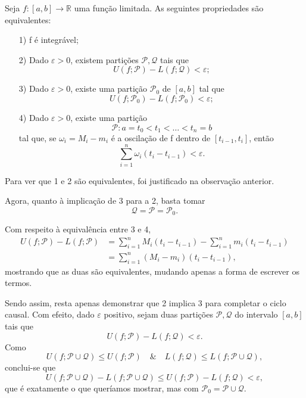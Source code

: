 \documentclass[../analysisII_notes.tex]{subfiles}
\begin{document}
\hypertarget{integrability_conditions}{
	\begin{theorem*}
		Seja \(f:[a, b]\rightarrow \mathbb{R}\) uma função limitada. As seguintes propriedades são equivalentes:
		\begin{itemize}
			\item[1)] f é integrável;
			\item[2)] Dado \(\varepsilon > 0\), existem partições \(\mathcal{P}, \mathcal{Q}\) tais que
			      \[
				      U(f; \mathcal{P}) - L(f; \mathcal{Q})<\varepsilon ;
			      \]
			\item[3)] Dado \(\varepsilon > 0\), existe uma partição \(\mathcal{P}_{0}\) de \([a, b]\) tal que
			      \[
				      U(f; \mathcal{P}_{0}) - L(f; \mathcal{P}_{0})<\varepsilon;
			      \]
			\item[4)] Dado \(\varepsilon > 0\), existe uma partição
			      \[
				      \mathcal{P}: a = t_{0}<t_1 <\dotsc <t_{n} = b
			      \]
			      tal que, se \(\omega_{i} = M_{i}-m_{i}\) é a oscilação de f dentro de \([t_{i-1}, t_{i}]\), então
			      \[
				      \sum\limits_{i=1}^{n}\omega_{i}(t_{i}-t_{i-1})<\varepsilon .
			      \]
		\end{itemize}
	\end{theorem*}
}
\begin{proof*}
	Para ver que 1 e 2 são equivalentes, foi justificado na observação anterior.

	Agora, quanto à implicação de 3 para a 2, basta tomar
	\[
		\mathcal{Q} = \mathcal{P} = \mathcal{P}_{0}.
	\]

	Com respeito à equivalência entre 3 e 4,
	\begin{align*}
		U(f; \mathcal{P}) - L(f; \mathcal{P}) & = \sum\limits_{i=1}^{n}M_{i}(t_{i}-t_{i-1})-\sum\limits_{i=1}^{n}m_{i}(t_{i}-t_{i-1}) \\
		                                      & = \sum\limits_{i=1}^{n}(M_{i}-m_{i})(t_{i}-t_{i-1}),
	\end{align*}
	mostrando que as duas são equivalentes, mudando apenas a forma de escrever os termos.

	Sendo assim, resta apenas demonstrar que 2 implica 3 para completar o ciclo causal. Com efeito, dado \(\varepsilon \) positivo, sejam duas partições \(\mathcal{P}, \mathcal{Q}\) do intervalo \([a, b]\) tais que
	\[
		U(f; \mathcal{P})-L(f; \mathcal{Q})<\varepsilon .
	\]
	Como
	\[
		U(f; \mathcal{P}\cup \mathcal{Q})\leq U(f; \mathcal{P})\quad\&\quad L(f; \mathcal{Q})\leq L(f; \mathcal{P}\cup \mathcal{Q}),
	\]
	conclui-se que
	\[
		U(f; \mathcal{P}\cup \mathcal{Q})-L(f; \mathcal{P}\cup \mathcal{Q})\leq U(f; \mathcal{P})-L(f; \mathcal{Q})<\varepsilon,
	\]
	que é exatamente o que queríamos mostrar, mas com \(\mathcal{P}_{0} = \mathcal{P}\cup \mathcal{Q}.\) \qedsymbol
\end{proof*}
\end{document}
